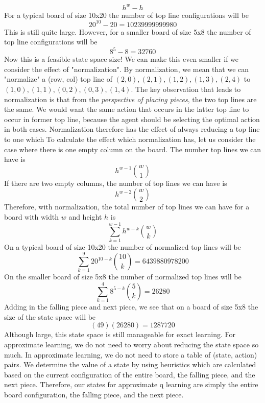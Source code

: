 \documentclass[11pt]{article}
\begin{document}
$$h^w - h$$
For a typical board of size 10x20 the number of top line configurations will be
$$20^{10} - 20 = 10239999999980$$
This is still quite large. However, for a smaller board of size 5x8 the number of top line configurations will be
$$8^5 - 8 = 32760$$
Now this is a feasible state space size! We can make this even smaller if we consider the effect of "normalization". By normalization, we mean that we can "normalize" a (row, col) top line of $(2,0),(2,1),(1,2),(1,3),(2,4)$ to $(1,0),(1,1),(0,2),(0,3),(1,4)$. The key observation that leads to normalization is that from the \textit{perspective of placing pieces}, the two top lines are the same. We would want the same action that occurs in the latter top line to occur in former top line, because the agent should be selecting the optimal action in both cases. Normalization therefore has the effect of always reducing a top line to one which To calculate the effect which normalization has, let us consider the case where there is one empty column on the board. The number top lines we can have is
$$h^{w-1}\binom{w}{1}$$
If there are two empty columns, the number of top lines we can have is
$$h^{w-2}\binom{w}{2}$$
Therefore, with normalization, the total number of top lines we can have for a board with width $w$ and height $h$ is
$$\sum_{k=1}^{w-1}h^{w-k}\binom{w}{k}$$
On a typical board of size 10x20 the number of normalized top lines will be
$$\sum_{k=1}^{9} 20^{10-k}\binom{10}{k} = 6439880978200$$
On the smaller board of size 5x8 the number of normalized top lines will be
$$\sum_{k=1}^{4} 8^{5-k}\binom{5}{k} = 26280$$
Adding in the falling piece and next piece, we see that on a board of size 5x8 the size of the state space will be
$$(49)(26280) = 1287720$$
Although large, this state space is still manageable for exact learning. For approximate learning, we do not need to worry about reducing the state space so much. In approximate learning, we do not need to store a table of (state, action) pairs. We determine the value of a state by using heuristics which are calculated based on the current configuration of the entire board, the falling piece, and the next piece. Therefore, our states for approximate q learning are simply the entire board configuration, the falling piece, and the next piece.
\end{document}
